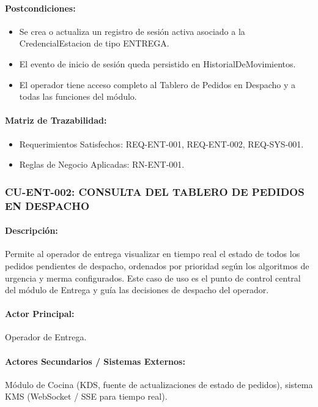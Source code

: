 \paragraph{Postcondiciones:}
\begin{itemize}
    \item Se crea o actualiza un registro de sesión activa asociado a la CredencialEstacion de tipo ENTREGA.
    \item El evento de inicio de sesión queda persistido en HistorialDeMovimientos.
    \item El operador tiene acceso completo al Tablero de Pedidos en Despacho y a todas las funciones del módulo.
\end{itemize}

\paragraph{Matriz de Trazabilidad:}
\begin{itemize}
    \item Requerimientos Satisfechos: REQ-ENT-001, REQ-ENT-002, REQ-SYS-001.
    \item Reglas de Negocio Aplicadas: RN-ENT-001.
\end{itemize}

\subsubsection{CU-ENT-002: CONSULTA DEL TABLERO DE PEDIDOS EN DESPACHO}
\paragraph{Descripción:} Permite al operador de entrega visualizar en tiempo real el estado de todos los pedidos pendientes de despacho, ordenados por prioridad según los algoritmos de urgencia y merma configurados. Este caso de uso es el punto de control central del módulo de Entrega y guía las decisiones de despacho del operador.

\paragraph{Actor Principal:} Operador de Entrega.

\paragraph{Actores Secundarios / Sistemas Externos:} Módulo de Cocina (KDS, fuente de actualizaciones de estado de pedidos), sistema KMS (WebSocket / SSE para tiempo real).

